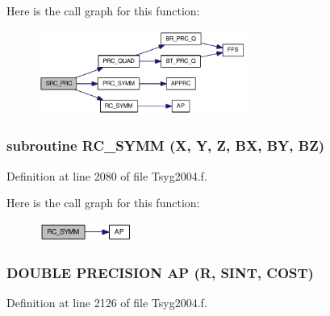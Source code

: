 Here is the call graph for this function:\nopagebreak
\begin{figure}[H]
\begin{center}
\leavevmode
\includegraphics[width=193pt]{_tsyg2004_8f_948852414e8750ea8068ebe4f3d03e96_cgraph}
\end{center}
\end{figure}
\hypertarget{_tsyg2004_8f_53c65a56be777ddfe059d5623b3ee80e}{
\subsubsection[{RC\_\-SYMM}]{\setlength{\rightskip}{0pt plus 5cm}subroutine RC\_\-SYMM (X, \/  Y, \/  Z, \/  BX, \/  BY, \/  BZ)}}
\label{_tsyg2004_8f_53c65a56be777ddfe059d5623b3ee80e}




Definition at line 2080 of file Tsyg2004.f.

Here is the call graph for this function:\nopagebreak
\begin{figure}[H]
\begin{center}
\leavevmode
\includegraphics[width=87pt]{_tsyg2004_8f_53c65a56be777ddfe059d5623b3ee80e_cgraph}
\end{center}
\end{figure}
\hypertarget{_tsyg2004_8f_6241cc7194479481c6845fe9216f73f9}{
\subsubsection[{AP}]{\setlength{\rightskip}{0pt plus 5cm}DOUBLE PRECISION AP (R, \/  SINT, \/  COST)}}
\label{_tsyg2004_8f_6241cc7194479481c6845fe9216f73f9}




Definition at line 2126 of file Tsyg2004.f.

